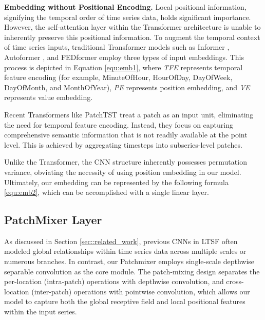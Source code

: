 \documentclass{article} \usepackage{iclr2024_conference,times}
\begin{document}
\noindent \textbf{Embedding without Positional Encoding.}  Local positional information, signifying the temporal order of time series data, holds significant importance. However, the self-attention layer within the Transformer architecture is unable to inherently preserve this positional information. To augment the temporal context of time series inputs, traditional Transformer models such as Informer \citep{informer}, Autoformer \citep{autoformer}, and FEDformer \citep{fedformer} employ three types of input embeddings. This process is depicted in Equation \ref{equ:emb1}, where \textit{TFE} represents temporal feature encoding (for example, MinuteOfHour, HourOfDay, DayOfWeek, DayOfMonth, and MonthOfYear), \textit{PE} represents position embedding, and \textit{VE} represents value embedding.
 
 

Recent Transformers like PatchTST treat a patch as an input unit, eliminating the need for temporal feature encoding. Instead, they focus on capturing comprehensive semantic information that is not readily available at the point level. This is achieved by aggregating timesteps into subseries-level patches.

 

Unlike the Transformer, the CNN structure inherently possesses permutation variance, obviating the necessity of using position embedding in our model. Ultimately, our embedding can be represented by the following formula \ref{equ:emb2}, which can be accomplished with a single linear layer.

 



\subsection{PatchMixer Layer}

As discussed in Section \ref{sec::related_work}, previous CNNs in LTSF often modeled global relationships within time series data across multiple scales or numerous branches. In contrast, our Patchmixer employs single-scale depthwise separable convolution as the core module. The patch-mixing design separates the per-location (intra-patch) operations with depthwise convolution, and cross-location (inter-patch) operations with pointwise convolution, which allows our model to capture both the global receptive field and local positional features within the input series.
\end{document}
